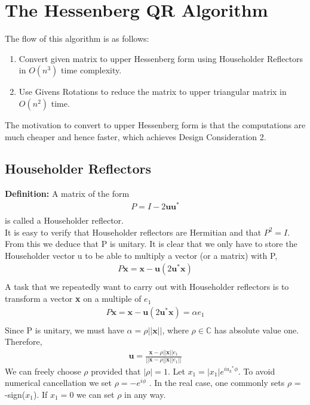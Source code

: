 
\chapter{The Hessenberg QR Algorithm} %

\label{Chapter3} %


The flow of this algorithm is as follows:
\begin{enumerate}
    \item Convert given matrix to upper Hessenberg form using Householder Reflectors in $O(n^3)$ time complexity.
    \item Use Givens Rotations to reduce the matrix to upper triangular matrix in $O(n^2)$ time.
\end{enumerate}
The motivation to convert to upper Hessenberg form is that the computations are much cheaper and hence faster, which achieves Design Consideration 2.
\section{Householder Reflectors}
\textbf{Definition: }A matrix of the form
\begin{align}
    P = I - 2\textbf{uu}^*\\
\end{align}
is called a Householder reflector.\\
It is easy to verify that Householder reflectors are Hermitian and that 
$P^2 = I$. From this
we deduce that P is unitary. It is clear that we only have to store the Householder
vector u to be able to multiply a vector (or a matrix) with P,
\begin{align}
    P\textbf{x} = \textbf{x} - \textbf{u}(2\textbf{u}^*\textbf{x})\\
\end{align}
A task that we repeatedly want to carry out with Householder reflectors is to transform
a vector \textbf{x} on a multiple of \textbf{$e_1$}
\begin{align}
    P\textbf{x} = \textbf{x} - \textbf{u}(2\textbf{u}^*\textbf{x}) = \alpha \textbf{$e_1$}\\
\end{align}
Since P is unitary, we must have $\alpha = \rho 
||\textbf{x}||$, where $\rho \in \mathbb{C}$ has absolute value one. Therefore,
\begin{align}
    \textbf{u} = \frac{\textbf{x} - \rho||\textbf{x}||\textbf{$e_1$}}{||\textbf{x} - \rho||\textbf{x}||\textbf{$e_1$}||}
\end{align}
We can freely choose $\rho$ provided that $|\rho| = 1$. Let $x_1 = |x_1|e^{i\textbf{$u_k$}^*\phi}$. To avoid numerical
cancellation we set $\rho = -e^{i\phi}$
.
In the real case, one commonly sets $\rho$ = -sign($x_1$). If $x_1 = 0$ we can set $\rho$ in any way.
